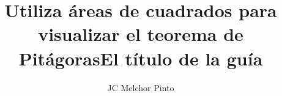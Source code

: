 \documentclass[12pt,addpoints,answers]{guia}
\title{Utiliza áreas de cuadrados para visualizar el teorema de Pitágoras}
\title{El título de la guía}
\author{JC Melchor Pinto}
\begin{document}
\pagestyle{headandfoot}

\INFO
\printanswers
\vspace{-0.5cm}
\begin{multicols}{2}
    
    
    \columnbreak
    
\end{multicols}
\begin{questions}
    \questionboxed[10]{}
    \questionboxed[10]{}
    \questionboxed[10]{}
    \questionboxed[10]{}
    \questionboxed[10]{}
    \questionboxed[10]{}
    \questionboxed[10]{}
    \questionboxed[10]{}
    \questionboxed[10]{}
\end{questions}
\end{document}
